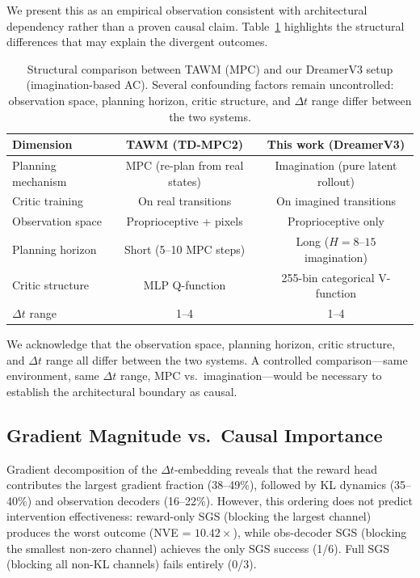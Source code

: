 \documentclass[10pt,letterpaper]{article}
\newcommand{\dt}{\Delta t}
\begin{document}
We present this as an empirical observation consistent with architectural dependency rather than a proven causal claim. Table~\ref{tab:tawm_comparison} highlights the structural differences that may explain the divergent outcomes.

\begin{table}[h]
\centering
\caption{Structural comparison between TAWM (MPC) and our DreamerV3 setup (imagination-based AC). Several confounding factors remain uncontrolled: observation space, planning horizon, critic structure, and $\dt$ range differ between the two systems.}
\label{tab:tawm_comparison}
\small
\begin{tabular}{lcc}
\toprule
\textbf{Dimension} & \textbf{TAWM (TD-MPC2)} & \textbf{This work (DreamerV3)} \\
\midrule
Planning mechanism & MPC (re-plan from real states) & Imagination (pure latent rollout) \\
Critic training    & On real transitions      & On imagined transitions \\
Observation space  & Proprioceptive + pixels  & Proprioceptive only \\
Planning horizon   & Short (5--10 MPC steps)  & Long ($H = 8$--$15$ imagination) \\
Critic structure   & MLP Q-function           & 255-bin categorical V-function \\
$\dt$ range        & 1--4                     & 1--4 \\
\bottomrule
\end{tabular}
\end{table}

We acknowledge that the observation space, planning horizon, critic structure, and $\dt$ range all differ between the two systems. A controlled comparison---same environment, same $\dt$ range, MPC vs.\ imagination---would be necessary to establish the architectural boundary as causal.

\subsection{Gradient Magnitude vs.\ Causal Importance}

Gradient decomposition of the $\dt$-embedding reveals that the reward head contributes the largest gradient fraction (38--49\%), followed by KL dynamics (35--40\%) and observation decoders (16--22\%). However, this ordering does not predict intervention effectiveness: reward-only SGS (blocking the largest channel) produces the worst outcome (NVE = $10.42\times$), while obs-decoder SGS (blocking the smallest non-zero channel) achieves the only SGS success (1/6). Full SGS (blocking all non-KL channels) fails entirely (0/3).
\end{document}

